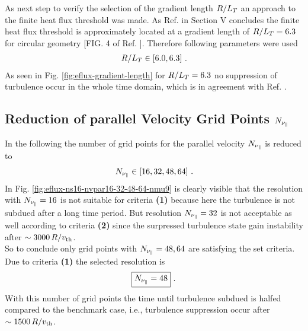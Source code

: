 As next step to verify the selection of the gradient length $R/L_T$ an approach to the finite heat flux threshold was made. As Ref.  in Section V concludes the finite heat flux threshold is approximately located at a gradient length of $R/L_T = 6.3$ for circular geometry [FIG. 4 of Ref. ]. Therefore following parameters were used
\begin{gather*}
	R/L_T \in [6.0, 6.3]~.
\end{gather*}
As seen in Fig. \ref{fig:eflux-gradient-length} for $R/L_T = 6.3$ no suppression of turbulence occur in the whole time domain, which is in agreement with Ref. .


\subsection{Reduction of parallel Velocity Grid Points $N_{\nu_\parallel}$}
\label{sub:reduceNvpar}

In the following the number of grid points for the parallel velocity $N_{\nu_\parallel}$ is reduced to
\begin{gather*}
	N_{\nu_\parallel} \in [16, 32, 48, 64]~.
\end{gather*}
In Fig. \ref{fig:eflux-ns16-nvpar16-32-48-64-nmu9} is clearly visible that the resolution with $N_{\nu_\parallel} = 16$ is not suitable for criteria \textbf{(1)} because here the turbulence is not subdued after a long time period. But resolution $N_{\nu_\parallel} = 32$ is not acceptable as well according to criteria \textbf{(2)} since the surpressed turbulence state gain instability after $\sim 3000\,R/v_{\mathrm{th}}$.\\
So to conclude only grid points with $N_{\nu_\parallel} = 48, 64$ are satisfying the set criteria. Due to criteria \textbf{(1)} the selected resolution is
\begin{gather*}
	\boxed{N_{\nu_\parallel} = 48}~.
\end{gather*}
With this number of grid points the time until turbulence subdued is halfed compared to the benchmark case, i.e., turbulence suppression occur after $\sim 1500\,R/v_{\mathrm{th}}$.



